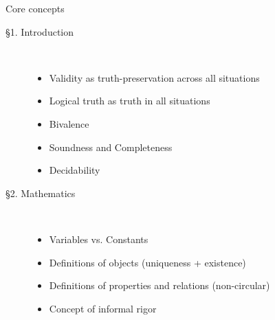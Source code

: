 \documentclass[../slides.tex]{subfiles}
\begin{document}
\begin{frame}{Core concepts}

	\begin{description}
	
		\item[\S1. Introduction] \
		
			\begin{itemize}
			
				\item Validity as truth-preservation across all situations
				
				\item Logical truth as truth in all situations
				
				\item Bivalence 
								
				\item Soundness and Completeness
				
				\item Decidability
			
			\end{itemize}
	
		\item[\S2. Mathematics] \
		
			\begin{itemize}
			
				\item Variables vs. Constants
				
				\item Definitions of objects (uniqueness + existence)
				
				\item Definitions of properties and relations (non-circular)
				
				\item Concept of informal rigor
			
			\end{itemize}
	
	\end{description}

\end{frame}
\end{document}
